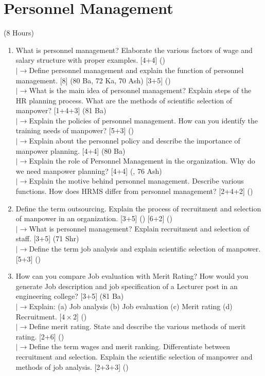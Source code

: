 \documentclass[12pt]{article}
\newcommand{\lb}{\\$\left|\rightarrow\right.$}
\begin{document}
\pagebreak
\section{Personnel Management}
\begin{center}(8 Hours)\end{center}
    \begin{enumerate}[topsep=0pt, noitemsep]
      \item What is personnel management? Elaborate the various factors of wage and salary structure with proper examples. \hfill [4+4] ()
        \lb Define personnel management and explain the function of personnel management. \hfill [8] (80 Ba, 72 Ka, 70 Ash) [3+5] ()
        \lb What is the main idea of personnel management? Explain steps of the HR planning process. What are the methods of scientific selection of manpower? \hfill [1+4+3] (81 Ba)
        \lb Explain the policies of personnel management. How can you identify the training needs of manpower? \hfill [5+3] ()
        \lb Explain about the personnel policy and describe the importance of manpower planning. \hfill [4+4] (80 Ba)
        \lb Explain the role of Personnel Management in the organization. Why do we need manpower planning? \hfill [4+4] (, 76 Ash)
        \lb Explain the motive behind personnel management. Describe various functions. How does HRMS differ from personnel management? \hfill [2+4+2] ()

      \item Define the term outsourcing. Explain the process of recruitment and selection of manpower in an organization. \hfill [3+5] () [6+2] ()
        \lb What is personnel management? Explain recruitment and selection of staff. \hfill [3+5] (71 Shr)
        \lb Define the term job analysis and explain scientific selection of manpower. \hfill [5+3] ()

      \item How can you compare Job evaluation with Merit Rating? How would you generate Job description and job specification of a Lecturer post in an engineering college? \hfill [3+5] (81 Ba)
        \lb Explain: (a) Job analysis (b) Job evaluation (c) Merit rating (d) Recruitment. \hfill [$4\times2$] ()
        \lb Define merit rating. State and describe the various methods of merit rating. \hfill [2+6] ()
        \lb Define the term wages and merit ranking. Differentiate between recruitment and selection. Explain the scientific selection of manpower and methods of job analysis. \hfill [2+3+3] ()


\end{enumerate}
\end{document}
